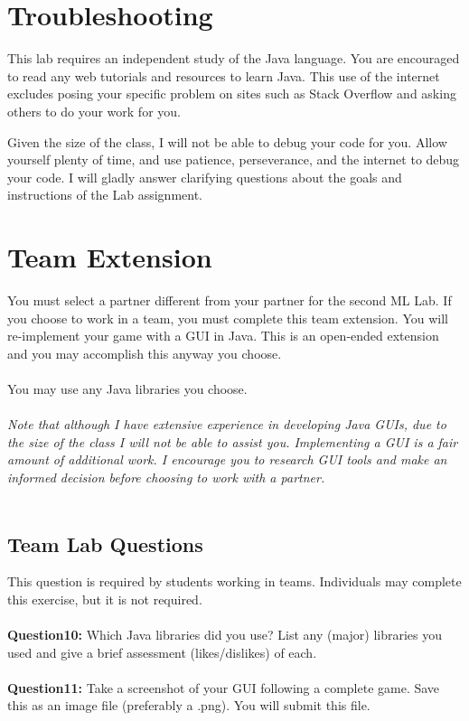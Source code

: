 \documentclass{article}
\begin{document}
\section*{Troubleshooting}
This lab requires an independent study of the Java language. You are encouraged to read any web tutorials and resources to learn Java. This use of the internet excludes posing your specific problem on sites such as Stack Overflow and asking others to do your work for you.

Given the size of the class, I will not be able to debug your code for you. Allow yourself plenty of time, and use patience, perseverance, and the internet to debug your code. I will gladly answer clarifying questions about the goals and instructions of the Lab assignment.

\section*{Team Extension}
You must select a partner different from your partner for the second ML Lab. If you choose to work in a team, you must complete this team extension. You will re-implement your game with a GUI in Java. This is an open-ended extension and you may accomplish this anyway you choose.
\\\\
\noindent You may use any Java libraries you choose.
\\\\
\noindent \textit{Note that although I have extensive experience in developing Java GUIs, due to the size of the class I will not be able to assist you. Implementing a GUI is a fair amount of additional work. I encourage you to research GUI tools and make an informed decision before choosing to work with a partner.}
\\\\
\begin{tcolorbox}
 \section*{Team Lab Questions}
 This question is required by students working in teams. Individuals may complete this exercise, but it is not required.
 \\\\
 \textbf{Question10:} Which Java libraries did you use? List any (major) libraries you used and give a brief assessment (likes/dislikes) of each.\\\\
 \textbf{Question11:} Take a screenshot of your GUI following a complete game. Save this as an image file (preferably a .png). You will submit this file.
\end{tcolorbox}
\end{document}
